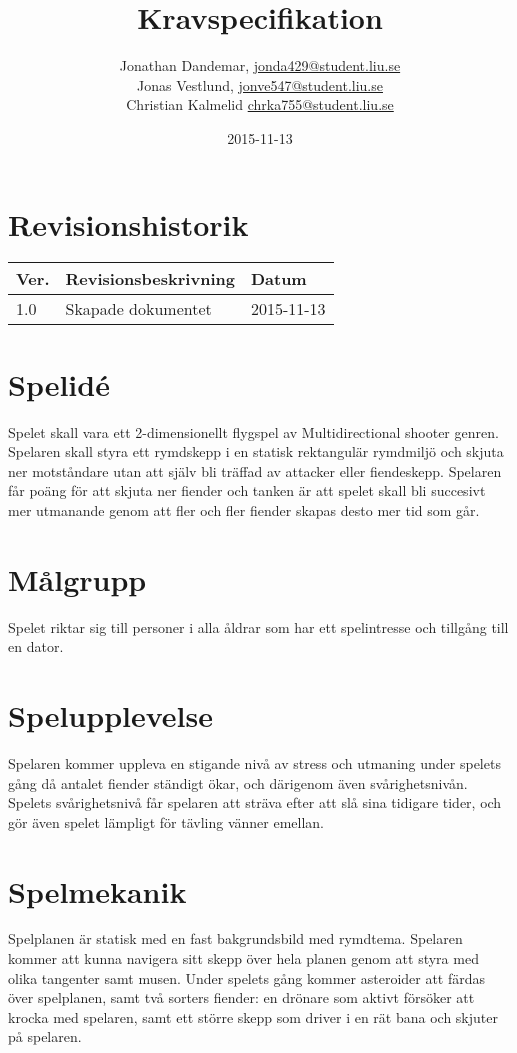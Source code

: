 \documentclass{TDP003mall}
\author{Jonathan Dandemar, \url{jonda429@student.liu.se}\\
  Jonas Vestlund, \url{jonve547@student.liu.se}\\
  Christian Kalmelid \url{chrka755@student.liu.se} \\
 }
\title{Kravspecifikation}
\date{2015-11-13}
\begin{document}
\projectpage
\section*{Revisionshistorik}
\begin{table}[!h]
\begin{tabularx}{\linewidth}{|l|X|l|}
\hline
Ver. & Revisionsbeskrivning & Datum \\\hline
1.0 & Skapade dokumentet & 2015-11-13 \\\hline
\end{tabularx}
\end{table}

\newpage

\section{Spelidé}
Spelet skall vara ett 2-dimensionellt flygspel av Multidirectional shooter genren. Spelaren skall styra ett rymdskepp i en statisk rektangulär rymdmiljö och skjuta ner motståndare utan att själv bli träffad av attacker eller fiendeskepp. Spelaren får poäng för att skjuta ner fiender och tanken är att spelet skall bli succesivt mer utmanande genom att fler och fler fiender skapas desto mer tid som går.
  
\section{Målgrupp}
Spelet riktar sig till personer i alla åldrar som har ett spelintresse och tillgång till en dator.

\section{Spelupplevelse}
Spelaren kommer uppleva en stigande nivå av stress och utmaning under spelets gång då antalet
fiender ständigt ökar, och därigenom även svårighetsnivån. Spelets svårighetsnivå får spelaren
att sträva efter att slå sina tidigare tider, och gör även spelet lämpligt för tävling
vänner emellan.

\section{Spelmekanik}
Spelplanen är statisk med en fast bakgrundsbild med rymdtema. Spelaren kommer att kunna navigera
sitt skepp över hela planen genom att styra med olika tangenter samt musen. Under spelets gång kommer
asteroider att färdas över spelplanen, samt två sorters fiender: en drönare som aktivt
försöker att krocka med spelaren, samt ett större skepp som driver i en rät bana och skjuter
på spelaren. 
\end{document}
